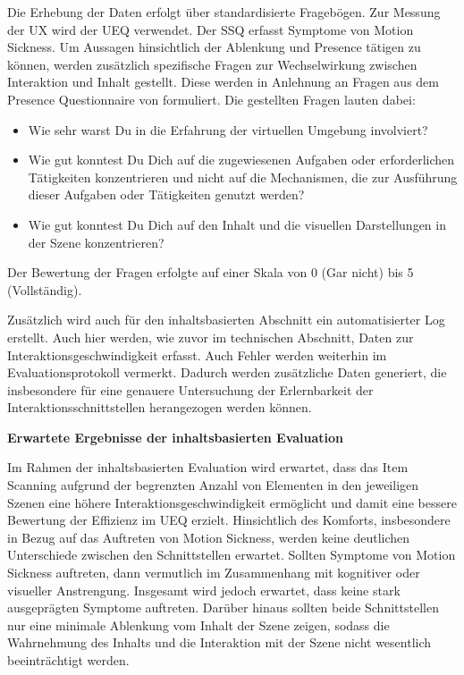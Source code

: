 Die Erhebung der Daten erfolgt über standardisierte Fragebögen. Zur Messung der UX wird der UEQ \citep{laugwitz_construction_2008} verwendet. Der SSQ \citep{kennedy_simulator_1993}erfasst Symptome von Motion Sickness. Um Aussagen hinsichtlich der Ablenkung und Presence tätigen zu können, werden zusätzlich spezifische Fragen zur Wechselwirkung zwischen Interaktion und Inhalt gestellt. Diese werden in Anlehnung an Fragen aus dem Presence Questionnaire von \citet{witmer_measuring_1998} formuliert. Die gestellten Fragen lauten dabei:

\begin{itemize}
    \item Wie sehr warst Du in die Erfahrung der virtuellen Umgebung involviert?
    \item Wie gut konntest Du Dich auf die zugewiesenen Aufgaben oder erforderlichen Tätigkeiten konzentrieren und nicht auf die Mechanismen, die zur Ausführung dieser Aufgaben oder Tätigkeiten genutzt werden?
    \item Wie gut konntest Du Dich auf den Inhalt und die visuellen Darstellungen in der Szene konzentrieren?
\end{itemize}

Der Bewertung der Fragen erfolgte auf einer Skala von 0 (Gar nicht) bis 5 (Vollständig). 

Zusätzlich wird auch für den inhaltsbasierten Abschnitt ein automatisierter Log erstellt. Auch hier werden, wie zuvor im technischen Abschnitt, Daten zur Interaktionsgeschwindigkeit erfasst. Auch Fehler werden weiterhin im Evaluationsprotokoll vermerkt. Dadurch werden zusätzliche Daten generiert, die insbesondere für eine genauere Untersuchung der Erlernbarkeit der Interaktionsschnittstellen herangezogen werden können.

\textbf{Erwartete Ergebnisse der inhaltsbasierten Evaluation}

Im Rahmen der inhaltsbasierten Evaluation wird erwartet, dass das Item Scanning aufgrund der begrenzten Anzahl von Elementen in den jeweiligen Szenen eine höhere Interaktionsgeschwindigkeit ermöglicht und damit eine bessere Bewertung der Effizienz im UEQ erzielt. Hinsichtlich des Komforts, insbesondere in Bezug auf das Auftreten von Motion Sickness, werden keine deutlichen Unterschiede zwischen den Schnittstellen erwartet. Sollten Symptome von Motion Sickness auftreten, dann vermutlich im Zusammenhang mit kognitiver oder visueller Anstrengung. Insgesamt wird jedoch erwartet, dass keine stark ausgeprägten Symptome auftreten.
Darüber hinaus sollten beide Schnittstellen nur eine minimale Ablenkung vom Inhalt der Szene zeigen, sodass die Wahrnehmung des Inhalts und die Interaktion mit der Szene nicht wesentlich beeinträchtigt werden.

